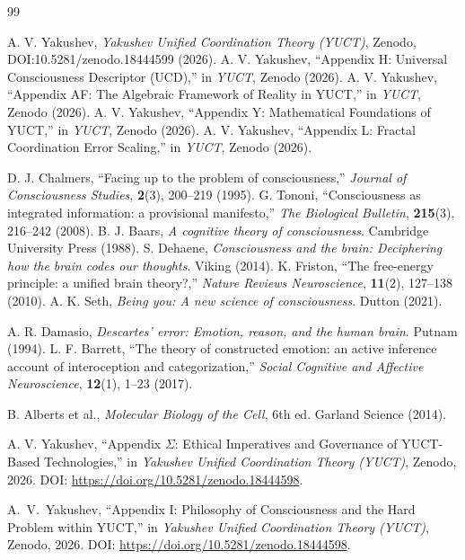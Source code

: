 \documentclass[12pt,a4paper]{article}
\begin{document}
	\begin{thebibliography}{99}
		
		 A. V. Yakushev, \emph{Yakushev Unified Coordination Theory (YUCT)}, Zenodo, DOI:10.5281/zenodo.18444599 (2026).
		 A. V. Yakushev, ``Appendix H: Universal Consciousness Descriptor (UCD),'' in \emph{YUCT}, Zenodo (2026).
		 A. V. Yakushev, ``Appendix AF: The Algebraic Framework of Reality in YUCT,'' in \emph{YUCT}, Zenodo (2026).
		 A. V. Yakushev, ``Appendix Y: Mathematical Foundations of YUCT,'' in \emph{YUCT}, Zenodo (2026).
		 A. V. Yakushev, ``Appendix L: Fractal Coordination Error Scaling,'' in \emph{YUCT}, Zenodo (2026).
		
		 D. J. Chalmers, ``Facing up to the problem of consciousness,'' \emph{Journal of Consciousness Studies}, \textbf{2}(3), 200--219 (1995).
		 G. Tononi, ``Consciousness as integrated information: a provisional manifesto,'' \emph{The Biological Bulletin}, \textbf{215}(3), 216--242 (2008).
		 B. J. Baars, \emph{A cognitive theory of consciousness}. Cambridge University Press (1988).
		 S. Dehaene, \emph{Consciousness and the brain: Deciphering how the brain codes our thoughts}. Viking (2014).
		 K. Friston, ``The free-energy principle: a unified brain theory?,'' \emph{Nature Reviews Neuroscience}, \textbf{11}(2), 127--138 (2010).
		 A. K. Seth, \emph{Being you: A new science of consciousness}. Dutton (2021).
		
		 A. R. Damasio, \emph{Descartes' error: Emotion, reason, and the human brain}. Putnam (1994).
		 L. F. Barrett, ``The theory of constructed emotion: an active inference account of interoception and categorization,'' \emph{Social Cognitive and Affective Neuroscience}, \textbf{12}(1), 1--23 (2017).
		
		 B. Alberts et al., \emph{Molecular Biology of the Cell}, 6th ed. Garland Science (2014).
		
		 A. V. Yakushev, ``Appendix \(\Sigma\): Ethical Imperatives and Governance of YUCT-Based Technologies,'' in \emph{Yakushev Unified Coordination Theory (YUCT)}, Zenodo, 2026. DOI: \url{https://doi.org/10.5281/zenodo.18444598}.
		
		 A.~V.~Yakushev, ``Appendix I: Philosophy of Consciousness and the Hard Problem within YUCT,'' in \emph{Yakushev Unified Coordination Theory (YUCT)}, Zenodo, 2026. DOI: \url{https://doi.org/10.5281/zenodo.18444598}.
		
	\end{thebibliography}
	
\end{document}
